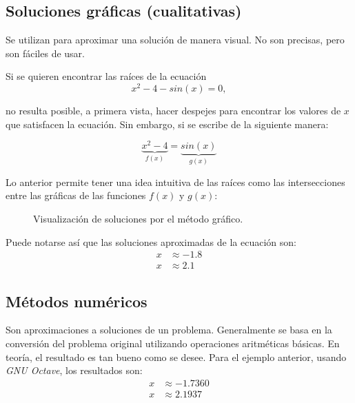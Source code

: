\subsection{Soluciones gráficas (cualitativas)}

Se utilizan para aproximar una solución de manera visual. No son precisas, pero
son fáciles de usar.

\begin{eg}
    Si se quieren encontrar las raíces de la ecuación
    \begin{equation}\label{primer-problema}
        x^2 - 4 - sin(x) = 0,
    \end{equation}

    \noindent no resulta posible, a primera vista, hacer despejes para
    encontrar los valores de \(x\) que satisfacen la ecuación. Sin embargo, si
    se escribe de la siguiente manera:

    \[
        \underbrace{x^2 - 4}_{f(x)} = \underbrace{sin(x)}_{g(x)}
    \]

    Lo anterior permite tener una idea intuitiva de las raíces como las
    intersecciones entre las gráficas de las funciones \(f(x)\) y \(g(x)\):

    \begin{figure}[H]
        \centering
        \caption{Visualización de soluciones por el método gráfico.}
    \end{figure}

    Puede notarse así que las soluciones aproximadas de la ecuación son:
    \begin{align*}
        x & \approx -1.8 \\
        x & \approx 2.1
    \end{align*}

\end{eg}

\subsection{Métodos numéricos}

Son aproximaciones a soluciones de un problema. Generalmente se basa en
la conversión del problema original utilizando operaciones aritméticas
básicas. En teoría, el resultado es tan bueno como se desee. Para el
ejemplo anterior, usando \emph{GNU Octave}, los resultados son:
\begin{align*}
    x & \approx -1.7360 \\
    x & \approx 2.1937
\end{align*}

